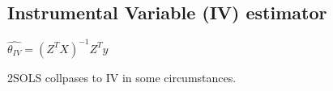 
\subsection{Instrumental Variable (IV) estimator}

\(\hat {\theta_{IV}} = (Z^TX)^{-1}Z^Ty\)

2SOLS collpases to IV in some circumstances.

